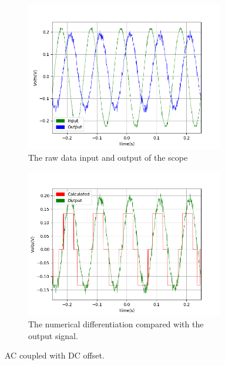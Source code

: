\begin{figure}[h!]
\centering
\begin{subfigure}[t]{.475\textwidth}
  \centering
  \includegraphics[width=0.95\textwidth, height=0.20\textheight]{figures/Differentiation/scope_21raw.png}
  \caption{The raw data input and output of the scope}
 \label{fig:diff_DC_raw}
\end{subfigure}\hfill
\begin{subfigure}[t]{.475\textwidth}
  \centering
  \includegraphics[width=0.95\textwidth, height=0.20\textheight]{figures/Differentiation/scope_21_calc_behind.png}
  \caption{The numerical differentiation compared with the output signal.}
\label{fig:diff_DC_filter}
\end{subfigure}
\caption{AC coupled with DC offset.}
\label{fig:diff_AC}
\end{figure}

